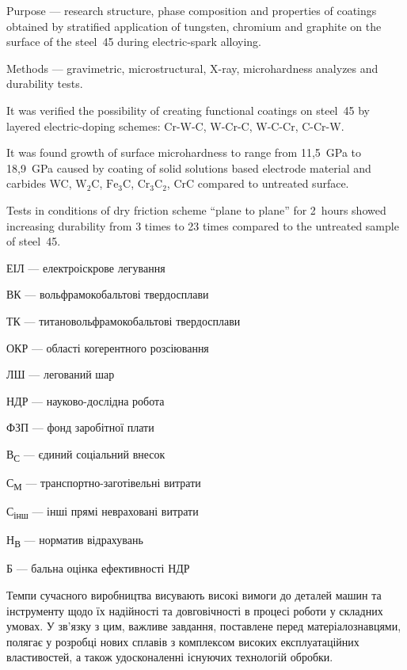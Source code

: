 \documentclass[a4paper,fontsize=14bp,ukrainian]{extreport}
\begin{document}
Purpose --- research structure, phase composition and properties of coatings obtained by stratified application of tungsten, chromium and graphite on the surface of the steel~45 during electric-spark alloying.

Methods --- gravimetric, microstructural, X-ray, microhardness analyzes and durability tests.

It was verified the possibility of creating functional coatings on steel~45 by layered electric-doping schemes: Cr-W-C, W-Cr-C, W-C-Cr, C-Cr-W.

It was found growth of surface microhardness to range from 11,5~GPa to 18,9~GPa caused by coating of solid solutions based electrode material and carbides WC, $\text{W}_2\text{C}$, $\text{Fe}_{3}\text{C}$, $\text{Cr}_{3}\text{C}_{2}$, $\text{CrC}$ compared to untreated surface.

Tests in conditions of dry friction scheme ``plane to plane'' for 2~hours showed increasing durability from 3 times to 23 times compared to the untreated sample of steel~45.

\newpage
\tableofcontents
\thispagestyle{empty}

\label{likechap:abbrevation}

ЕІЛ --- електроіскрове легування

ВК --- вольфрамокобальтові твердосплави

ТК --- титановольфрамокобальтові твердосплави

ОКР --- області когерентного розсіювання

ЛШ --- легований шар

НДР --- науково-дослідна робота

ФЗП  --- фонд заробітної плати

В\textsubscript{С} --- єдиний соціальний внесок

С\textsubscript{М} --- транспортно-заготівельні витрати

С\textsubscript{інш} --- інші прямі невраховані витрати

Н\textsubscript{В} --- норматив відрахувань

Б --- бальна оцінка ефективності НДР


\label{likechap:intro}

Темпи сучасного виробництва висувають високі вимоги до деталей машин та інструменту щодо їх надійності та довговічності в процесі роботи у складних умовах. У зв’язку з цим, важливе завдання, поставлене перед матеріалознавцями, полягає у розробці нових сплавів з комплексом високих експлуатаційних властивостей, а також удосконаленні існуючих технологій обробки.
\end{document}

